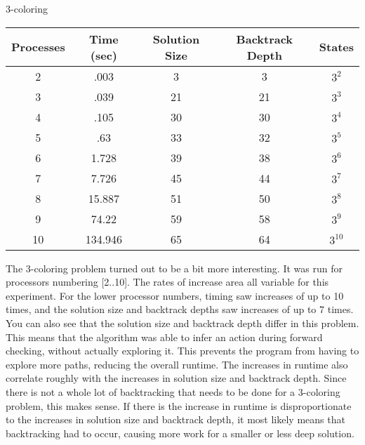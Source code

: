 \begin{center}
3-coloring \\
\begin{tabular}{|c|c|c|c|c|}
\hline
 Processes & Time (sec) & Solution Size & Backtrack Depth & States \\
\hline
 2 & .003 & 3 & 3 & $3^{2}$           \\
 3 & .039 & 21 & 21 & $3^{3}$         \\
 4 & .105 & 30 & 30 & $3^{4}$          \\
 5 & .63 & 33 & 32 & $3^{5}$          \\
 6 & 1.728 & 39 & 38 & $3^{6}$        \\
 7 & 7.726 & 45 & 44 & $3^{7}$        \\
 8 & 15.887 & 51 & 50 & $3^{8}$       \\
 9 & 74.22 & 59 & 58 & $3^{9}$        \\
 10 & 134.946 & 65 & 64 & $3^{10}$    \\
\hline
\end{tabular}
\end{center}

The 3-coloring problem turned out to be a bit more interesting.  It was run for processors numbering [2..10].  The rates of increase area all variable
for this experiment.  For the lower processor numbers, timing saw increases of up to 10 times, and the solution size and backtrack depths saw increases
of up to 7 times.  You can also see that the solution size and backtrack depth differ in this problem.  This means that the algorithm was able to infer
an action during forward checking, without actually exploring it.  This prevents the program from having to explore more paths, reducing the overall
runtime.  The increases in runtime also correlate roughly with the increases in solution size and backtrack depth.  Since there is not a whole lot
of backtracking that needs to be done for a 3-coloring problem, this makes sense.  If there is the increase in runtime is disproportionate to the
increases in solution size and backtrack depth, it most likely means that backtracking had to occur, causing more work for a smaller or less deep
solution.

